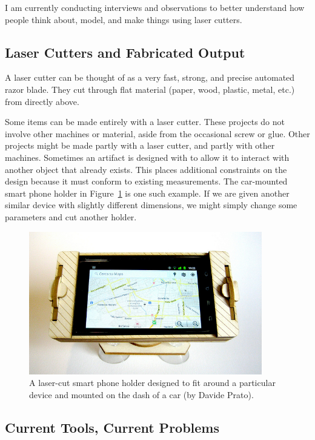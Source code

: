 \documentclass[11pt]{article}
\begin{document}
I am currently conducting interviews and observations to better
understand how people think about, model, and make things using laser
cutters. 

\subsection{Laser Cutters and Fabricated Output}

A laser cutter can be thought of as a very fast, strong, and precise
automated razor blade. They cut through flat material (paper, wood,
plastic, metal, etc.) from directly above.

Some items can be made entirely with a laser cutter. These projects do
not involve other machines or material, aside from the occasional
screw or glue. Other projects might be made partly with a laser
cutter, and partly with other machines. Sometimes an artifact is
designed with to allow it to interact with another object that already
exists. This places additional constraints on the design because it
must conform to existing measurements. The car-mounted smart phone
holder in Figure~\ref{fig:phone-holder} is one such example. If we are
given another similar device with slightly different dimensions, we
might simply change some parameters and cut another holder.

\begin{figure}[h] %
   \centering
   \includegraphics[width=4in]{img/phone-holder.jpg} 
   \caption{A laser-cut smart phone holder designed to fit around a
     particular device and mounted on the dash of a car (by Davide
     Prato).}
   \label{fig:phone-holder}
\end{figure}

\subsection{Current Tools, Current Problems}
\end{document}
